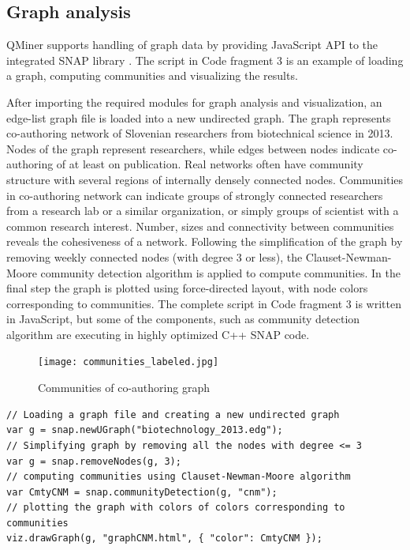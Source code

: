 \documentclass{article} %
\begin{document}
\subsection{Graph analysis}
QMiner supports handling of graph data by providing JavaScript API to the integrated SNAP library \cite{snap}. The script in Code fragment 3 is an example of loading a graph, computing communities and visualizing the results.

After importing the required modules for graph analysis and visualization, an edge-list graph file is loaded into a new undirected graph. The graph represents co-authoring network of Slovenian researchers from biotechnical science in 2013. Nodes of the graph represent researchers, while edges between nodes indicate co-authoring of at least on publication. Real networks often have community structure with several regions of internally densely connected nodes. Communities in co-authoring network can indicate groups of strongly connected researchers from a research lab or a similar organization, or simply groups of scientist with a common research interest. Number, sizes and connectivity between communities reveals the cohesiveness of a network. Following the simplification of the graph by removing weekly connected nodes (with degree 3 or less), the Clauset-Newman-Moore \cite{clauset-newman-moore} community detection algorithm is applied to compute communities. In the final step the graph is plotted using force-directed layout, with node colors corresponding to communities. The complete script in Code fragment 3 is written in JavaScript, but some of the components, such as community detection algorithm are executing in highly optimized C++ SNAP code.

\begin{figure}[h]
\begin{center}
\texttt{[image: communities\_labeled.jpg]}
\caption{Communities of co-authoring graph}
\end{center}
\end{figure}

\begin{lstlisting}[caption=Graph analysis]
// Loading a graph file and creating a new undirected graph
var g = snap.newUGraph("biotechnology_2013.edg");
// Simplifying graph by removing all the nodes with degree <= 3
var g = snap.removeNodes(g, 3);
// computing communities using Clauset-Newman-Moore algorithm
var CmtyCNM = snap.communityDetection(g, "cnm");
// plotting the graph with colors of colors corresponding to communities
viz.drawGraph(g, "graphCNM.html", { "color": CmtyCNM });
\end{lstlisting}
\end{document}
